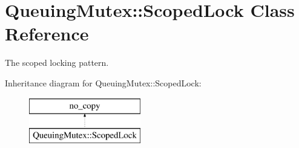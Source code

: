 \hypertarget{classQueuingMutex_1_1ScopedLock}{}\section{Queuing\+Mutex\+:\+:Scoped\+Lock Class Reference}
\label{classQueuingMutex_1_1ScopedLock}


The scoped locking pattern.  


Inheritance diagram for Queuing\+Mutex\+:\+:Scoped\+Lock\+:\begin{figure}[H]
\begin{center}
\leavevmode
\includegraphics[height=2.000000cm]{classQueuingMutex_1_1ScopedLock}
\end{center}
\end{figure}
